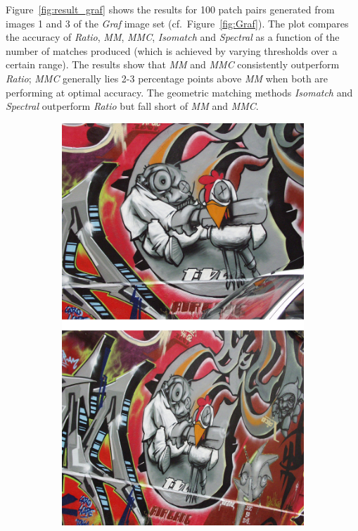 Figure~\ref{fig:result_graf} shows the results for 100 patch pairs 
generated from images 1 and 3 of the \emph{Graf} image set 
(cf.~Figure~\ref{fig:Graf}). The plot compares the accuracy of 
\emph{Ratio}, \emph{MM}, \emph{MMC}, \emph{Isomatch} and \emph{Spectral} 
as a function of the number of matches produced (which is achieved by 
varying thresholds over a certain range). The results show that 
\emph{MM} and \emph{MMC} consistently outperform \emph{Ratio}; 
\emph{MMC} generally lies 2-3 percentage points above \emph{MM} when 
both are performing at optimal accuracy.  The geometric matching methods 
\emph{Isomatch} and \emph{Spectral} outperform \emph{Ratio} but fall 
short of \emph{MM} and \emph{MMC}.


\begin{figure}[htb]
	\begin{subfigure}[c]{0.2\textwidth}
		\centering
		\includegraphics[width=\textwidth]{images/graf}

\end{subfigure}
\end{figure}
